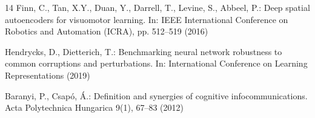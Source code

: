 \documentclass[runningheads]{llncs}
\begin{document}
\begin{thebibliography}{14}
Finn, C., Tan, X.Y., Duan, Y., Darrell, T., Levine, S., Abbeel, P.: Deep
spatial autoencoders for visuomotor learning. In: IEEE International
Conference on Robotics and Automation (ICRA), pp. 512--519 (2016)

Hendrycks, D., Dietterich, T.: Benchmarking neural network robustness to
common corruptions and perturbations. In: International Conference on
Learning Representations (2019)

Baranyi, P., Csap\'o, \'A.: Definition and synergies of cognitive
infocommunications. Acta Polytechnica Hungarica 9(1), 67--83 (2012)

\end{thebibliography}
\end{document}
